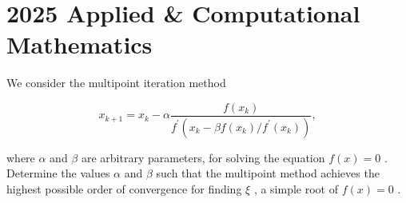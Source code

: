 \section{2025 Applied \& Computational Mathematics}

\begin{exercise}
\label{applied:2025:1}
We consider the multipoint iteration method

\[
x _ {k + 1} = x _ {k} - \alpha \frac {f (x _ {k})}{f ^ {\prime} \left(x _ {k} - \beta f (x _ {k}) / f ^ {\prime} (x _ {k})\right)},
\]

where $\alpha$ and $\beta$ are arbitrary parameters, for solving the equation $f ( x ) = 0$ . Determine the values $\alpha$ and $\beta$ such that the multipoint method achieves the highest possible order of convergence for finding $\xi$ , a simple root of $f ( x ) = 0$ .
\end{exercise}

